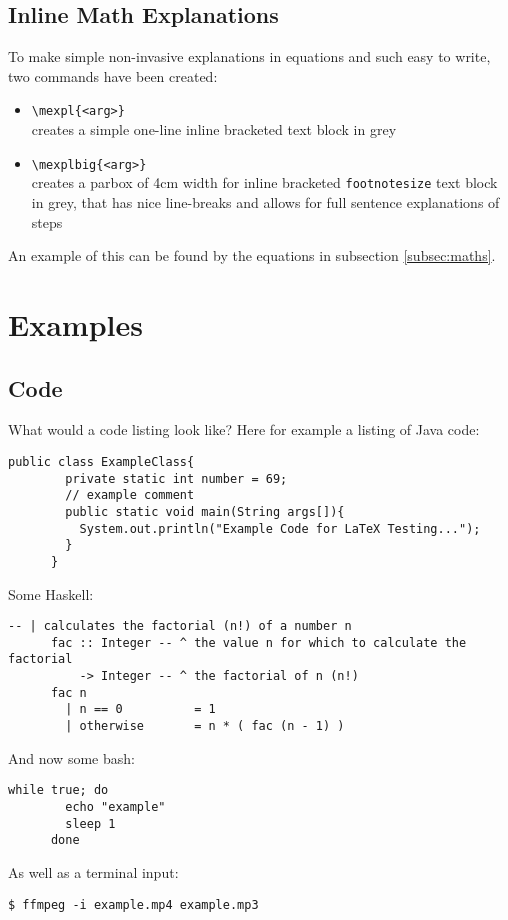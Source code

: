 \documentclass{article}
\begin{document}
  \subsection{Inline Math Explanations}
    To make simple non-invasive explanations in equations and such easy to
    write, two commands have been created: 
    \begin{itemize}
      \item \texttt{\textbackslash mexpl\{<arg>\}} \\ creates a simple one-line
            inline bracketed text block in grey
      \item \texttt{\textbackslash mexplbig\{<arg>\}} \\ creates a parbox of
            4cm width for inline bracketed \texttt{footnotesize} text block in
            grey, that has nice line-breaks and allows for full sentence
            explanations of steps 
    \end{itemize}
    An example of this can be found by the equations in subsection
    \ref{subsec:maths}. 


\section{Examples}
  \subsection{Code}
    What would a code listing look like? Here for example a listing of Java
    code: 
    \begin{lstlisting}[gobble=6]
      public class ExampleClass{
        private static int number = 69; 
        // example comment 
        public static void main(String args[]){
          System.out.println("Example Code for LaTeX Testing...");
        }
      }
    \end{lstlisting}

    Some Haskell: 
    \begin{lstlisting}[style=haskell,gobble=6]
      -- | calculates the factorial (n!) of a number n
      fac :: Integer -- ^ the value n for which to calculate the factorial 
          -> Integer -- ^ the factorial of n (n!)
      fac n 
        | n == 0          = 1 
        | otherwise       = n * ( fac (n - 1) )
    \end{lstlisting}

    And now some bash: 
    \begin{lstlisting}[style=bash,gobble=6]
      while true; do
        echo "example" 
        sleep 1
      done
    \end{lstlisting}
    As well as a terminal input: 
    \begin{lstlisting}[style=terminal,gobble=6]
      $ ffmpeg -i example.mp4 example.mp3
    \end{lstlisting}
\end{document}
